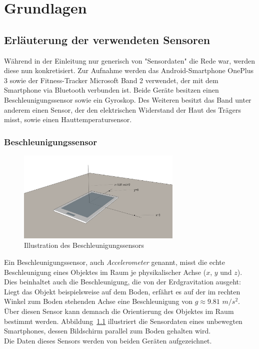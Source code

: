 \chapter{Grundlagen}
\label{chap:background}
\section{Erläuterung der verwendeten Sensoren}
Während in der Einleitung nur generisch von "Sensordaten" die Rede war, werden diese nun konkretisiert. Zur Aufnahme werden das Android-Smartphone OnePlus 3 sowie der Fitness-Tracker Microsoft Band 2 verwendet, der mit dem Smartphone via Bluetooth verbunden ist. Beide Geräte besitzen einen Beschleunigungssensor sowie ein Gyroskop. Des Weiteren besitzt das Band unter anderem einen Sensor, der den elektrischen Widerstand der Haut des Trägers misst, sowie einen Hauttemperatursensor.

\subsection{Beschleunigungssensor}
\begin{figure}
\centering
\includegraphics[clip=true,trim=0mm 100mm 100mm 30mm, width=0.7\textwidth]{img/accelerometer}
\caption{Illustration des Beschleunigungssensors}
\label{fig:accelerometer}
\end{figure}
Ein Beschleunigungssensor, auch \textit{Accelerometer} genannt, misst die echte Beschleunigung eines Objektes im Raum je physikalischer Achse ($x$, $y$ und $z$). Dies beinhaltet auch die Beschleunigung, die von der Erdgravitation ausgeht: Liegt das Objekt beispielsweise auf dem Boden, erfährt es auf der im rechten Winkel zum Boden stehenden Achse eine Beschleunigung von $g \approx 9.81$ $m/s^2$\cite{SensorsOverview}\cite{nistsi}. Über diesen Sensor kann demnach die Orientierung des Objektes im Raum bestimmt werden. Abbildung~\ref{fig:accelerometer} illustriert die Sensordaten eines unbewegten Smartphones, dessen Bildschirm parallel zum Boden gehalten wird. \\
Die Daten dieses Sensors werden von beiden Geräten aufgezeichnet.

